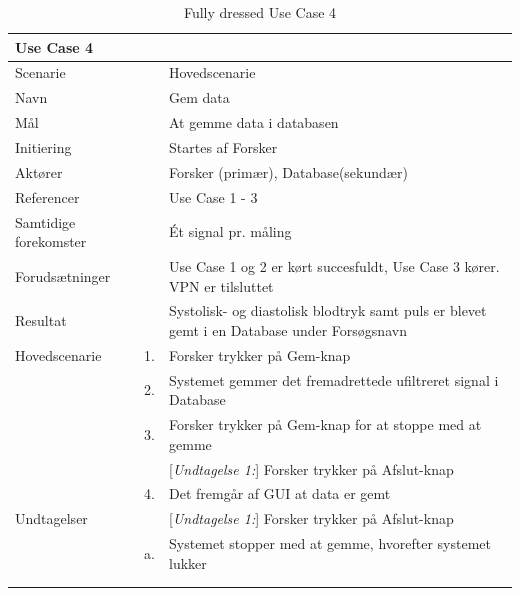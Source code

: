 \begin{longtabu} to  %
    {\large \textbf{Use Case 4}} && \\
    \toprule
    Scenarie && Hovedscenarie\\
    Navn && Gem data\\
    Mål && At gemme data i databasen\\
    Initiering && Startes af Forsker\\
    Aktører && Forsker (primær), Database(sekundær)\\
    Referencer && Use Case 1 - 3 \\
    Samtidige forekomster  &&  Ét signal pr. måling\\
    Forudsætninger && Use Case 1 og 2 er kørt succesfuldt, Use Case 3 kører. VPN er tilsluttet\\
    Resultat && Systolisk- og diastolisk blodtryk samt puls er blevet gemt i en Database under Forsøgsnavn\\ \midrule
    Hovedscenarie &    1. &		Forsker trykker på Gem-knap\\[-1ex] 
    &	2. & Systemet gemmer det fremadrettede ufiltreret signal i Database\\
                  &    3. &  Forsker trykker på Gem-knap for at stoppe med at gemme\\
    &	&			[\textit{Undtagelse 1:}] Forsker trykker på Afslut-knap\\
                    &    4. &   Det fremgår af GUI at data er gemt\\ \midrule	 	
 Undtagelser &    & [\textit{Undtagelse 1:}] Forsker trykker på Afslut-knap\\
 & a. 	&  Systemet stopper med at gemme, hvorefter systemet lukker\\  

 \\ \bottomrule
\caption{Fully dressed Use Case 4}
\label{UC4}
\end{longtabu}

